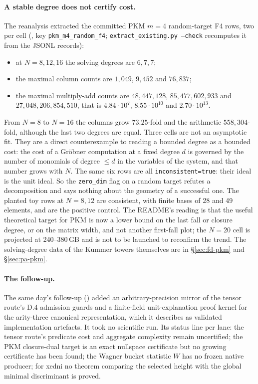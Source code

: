 \paragraph{A stable degree does not certify cost.} The reanalysis extracted
the committed PKM $m=4$ random-target F4 rows, two per cell
(, key
\texttt{pkm\_m4\_random\_f4}; \texttt{extract\_existing.py --check}
recomputes it from the JSONL records):
\begin{itemize}
\item at $N=8,12,16$ the solving degrees are $6,7,7$;
\item the maximal column counts are $1{,}049$, $9{,}452$ and $76{,}837$;
\item the maximal multiply-add counts are $48{,}447{,}128$,
  $85{,}477{,}602{,}933$ and $27{,}048{,}206{,}854{,}510$, that is
  $4.84\cdot10^7$, $8.55\cdot10^{10}$ and $2.70\cdot10^{13}$.
\end{itemize}
From $N=8$ to $N=16$ the columns grow $73.25$-fold and the arithmetic
$558{,}304$-fold, although the last two degrees are equal. Three cells are
not an asymptotic fit. They are a direct counterexample to reading a
bounded degree as a bounded cost: the cost of a Gröbner computation at a
fixed degree $d$ is governed by the number of monomials of degree $\le d$ in
the variables of the system, and that number grows with $N$. The same six
rows are all \texttt{inconsistent=true}: their ideal is the unit ideal. So
the \texttt{zero\_dim} flag on a random target refutes a decomposition and
says nothing about the geometry of a successful one. The planted toy rows at
$N=8,12$ are consistent, with finite bases of 28 and 49 elements, and are the
positive control. The README's reading is that the useful theoretical target
for PKM is now a lower bound on the last fall or closure degree, or on the
matrix width, and not another first-fall plot; the $N=20$ cell is projected
at 240--380\,GB and is not to be launched to reconfirm the trend. The
solving-degree data of the Kummer towers themselves are in
\S\ref{sec:fd-pkm} and \S\ref{sec:pa-pkm}.

\paragraph{The follow-up.} The same day's follow-up
() added an
arbitrary-precision mirror of the tensor route's D.4 admission guards and a
finite-field unit-explanation proof kernel for the arity-three canonical
representation, which it describes as validated implementation artefacts.
It took no scientific run. Its status line per lane: the tensor route's
predicate cost and aggregate complexity remain uncertified; the PKM
closure-dual target is an exact nullspace certificate but no growing
certificate has been found; the Wagner bucket statistic $W$ has no frozen
native producer; for xedni no theorem comparing the selected height with the
global minimal discriminant is proved.

